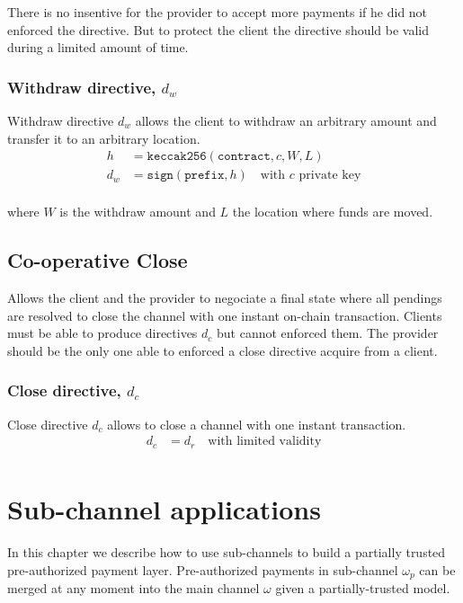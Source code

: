 \documentclass{llncs}
\begin{document}
There is no insentive for the provider to accept more payments if he did not enforced the directive. But to protect the client the directive should be valid during a limited amount of time.

\subsubsection{Withdraw directive, $d_w$} Withdraw directive $d_w$ allows the client to withdraw an arbitrary amount and transfer it to an arbitrary location.
\begin{equation*}
\begin{split}
    h &= \texttt{keccak256}(\texttt{contract},c,W,L) \\
    d_w &= \texttt{sign}(\texttt{prefix}, h) \quad \text{with $c$ private key} \\
\end{split}
\end{equation*}

where $W$ is the withdraw amount and $L$ the location where funds are moved.

\subsection{Co-operative Close} Allows the client and the provider to negociate a final state where all pendings are resolved to close the channel with one instant on-chain transaction. Clients must be able to produce directives $d_c$ but cannot enforced them. The provider should be the only one able to enforced a close directive acquire from a client.

\subsubsection{Close directive, $d_c$} Close directive $d_c$ allows to close a channel with one instant transaction.
\begin{equation*}
\begin{split}
    d_c &= d_r \quad \text{with limited validity} \\
\end{split}
\end{equation*}

\section{Sub-channel applications} In this chapter we describe how to use sub-channels to build a partially trusted pre-authorized payment layer. Pre-authorized payments in sub-channel $\omega_p$ can be merged at any moment into the main channel $\omega$ given a partially-trusted model.
\end{document}
